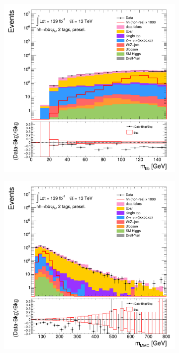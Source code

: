 \begin{figure}[htbp]
\begin{subfigure}{.32\textwidth}
\caption{}
\label{fig:MVAvariables:d}
\end{subfigure}
\begin{subfigure}{.32\textwidth}
\centering
\includegraphics[width=0.85\linewidth]{DiHiggs/plots/MVA/LTT_Final/HNone/BDTVarsPreselection/2/C_2tag2pjet_0ptv_mbb_Log.png}
\caption{}
\label{fig:MVAvariables:e}
\end{subfigure}
\begin{subfigure}{.32\textwidth}
\centering
\includegraphics[width=0.85\linewidth]{DiHiggs/plots/MVA/LTT_Final/HNone/BDTVarsPreselection/2/C_2tag2pjet_0ptv_mMMC_Log.png}

\end{subfigure}
\end{figure}
